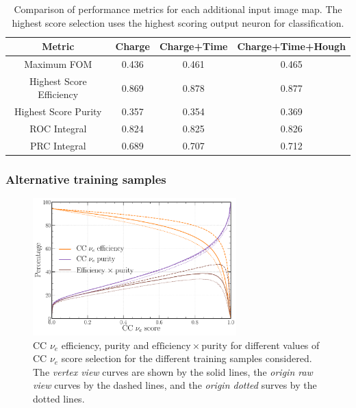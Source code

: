 \begin{table}
    \begin{tabular}{cccc}
        Metric                   & Charge & Charge+Time & Charge+Time+Hough \\
        \midrule
        Maximum FOM              & 0.436  & 0.461       & 0.465             \\
        Highest Score Efficiency & 0.869  & 0.878       & 0.877             \\
        Highest Score Purity     & 0.357  & 0.354       & 0.369             \\
        ROC Integral             & 0.824  & 0.825       & 0.826             \\
        PRC Integral             & 0.689  & 0.707       & 0.712             \\
    \end{tabular}
    \caption[Comparison of performance metrics for each additional input image map.]
    {Comparison of performance metrics for each additional input image map. The highest score
        selection uses the highest scoring output neuron for classification.}
    \label{tab:chan}
\end{table}

\subsubsection*{Alternative training samples} %

\begin{figure} %
    \includegraphics[width=0.7\textwidth]{diagrams/6-cvn/chipsnet/sample_nuel_eff_curves.pdf}
    \caption[CC $\nu_{e}$ efficiency and purity curves for the different training samples.]
    {CC $\nu_{e}$ efficiency, purity and $\mathrm{efficiency}\times\mathrm{purity}$ for different
        values of CC $\nu_{e}$ score selection for the different training samples considered. The
        \emph{vertex view} curves are shown by the solid lines, the \emph{origin raw view} curves
        by the dashed lines, and the \emph{origin dotted} surves by the dotted lines.}
    \label{fig:sample_nuel_eff_curves}
\end{figure}

